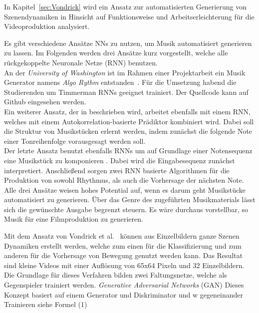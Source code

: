 \documentclass[times, 12pt,twocolumn]{article}
\begin{document}
In Kapitel~\ref{sec:Vondrick} wird ein Ansatz zur automatisierten Generierung von Szenendynamiken in Hinsicht auf Funktionsweise und Arbeitserleichterung für die Videoproduktion analysiert. 


 \label{sec:SOTAProduktion}
Es gibt verschiedene Ansätze NNs zu nutzen, um Musik automatisiert generieren zu lassen. Im Folgenden werden drei Ansätze kurz vorgestellt, welche alle rückgekoppelte Neuronale Netze (RNN) benutzen. \\
An der \textit{University of Washington} ist im Rahmen einer Projektarbeit ein Musik Generator namens \textit{Algo Rythm} entstanden~\cite{Algorithm}. Für die Umsetzung habend die Studierenden um Timmerman RNNs geeignet trainiert. Der Quellcode kann auf Github \cite{AlgorithmGit} eingesehen werden.\\
Ein weiterer Ansatz, der in \cite{eck+lapalme:2008} beschrieben wird, arbeitet ebenfalls mit einem RNN, welches mit einem Autokorrelation-basierte Prädiktor kombiniert wird. Dabei soll die Struktur von Musikstücken erlernt werden, indem zunächst die folgende Note einer Tonreihenfolge vorausgesagt werden soll. \\
Der letzte Ansatz benutzt ebenfalls RNNs um auf Grundlage einer Notensequenz eine Musikstück zu komponieren \cite{browne2001system}. Dabei wird die Eingabesequenz zunächst interpretiert. Anschließend sorgen zwei RNN basierte Algorithmen für die Produktion von sowohl Rhythmus, als auch die Vorhersage der nächsten Note. \\

Alle drei Ansätze weisen hohes Potential auf, wenn es darum geht Musikstücke automatisiert zu generieren. Über das Genre des zugeführten Musikmaterials lässt sich die gewünschte Ausgabe begrenzt steuern. Es wäre durchaus vorstellbar, so Musik für eine Filmproduktion zu generieren.






 \label{sec:Vondrick}
Mit dem Ansatz von Vondrick et al.~\cite{Vondrick} können aus Einzelbildern ganze Szenen Dynamiken erstellt werden, welche zum einen für die Klassifizierung und zum anderen für die Vorhersage von Bewegung genutzt werden kann. Das Resultat sind kleine Videos mit einer Auflösung von 65x64 Pixeln und 32 Einzelbildern. \\

Die Grundlage für dieses Verfahren bilden zwei Faltungsnetze, welche als Gegenspieler trainiert werden. \textit{Generative Adversarial Networks} (GAN) \cite{NIPS2014_5423} Dieses Konzept basiert auf einem Generator und Diskriminator und w
gegeneinander Trainieren siehe Formel (1)
\end{document}
